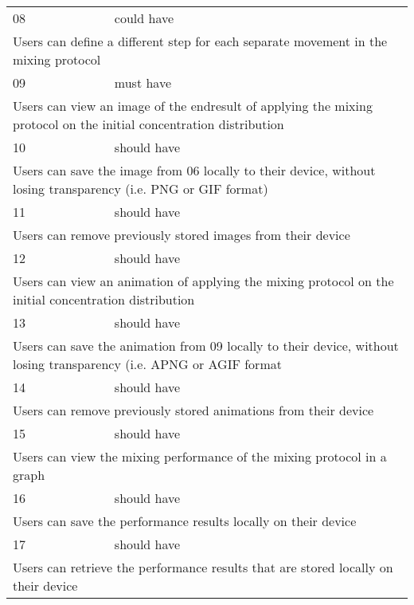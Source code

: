\begin{center}
\begin{tabular}{ p{} p{}}
08 & could have \\
\multicolumn{2}{p{\textwidth}}{Users can define a different step for each separate movement in the mixing protocol}\\
\hline

09 & must have \\
\multicolumn{2}{p{\textwidth}}{Users can view an image of the endresult of applying the mixing protocol on the initial concentration distribution} \\
\hline

10 & should have \\
\multicolumn{2}{p{\textwidth}}{Users can save the image from 06 locally to their device, without losing transparency (i.e. PNG or GIF format)} \\
\hline

11 & should have \\
\multicolumn{2}{p{\textwidth}}{Users can remove previously stored images from their device} \\
\hline

12 & should have \\
\multicolumn{2}{p{\textwidth}}{Users can view an animation of applying the mixing protocol on the initial concentration distribution} \\
\hline

13 & should have \\
\multicolumn{2}{p{\textwidth}}{Users can save the animation from 09 locally to their device, without losing transparency (i.e. APNG or AGIF format} \\
\hline

14 & should have \\
\multicolumn{2}{p{\textwidth}}{Users can remove previously stored animations from their device} \\
\hline

15 & should have \\
\multicolumn{2}{p{\textwidth}}{Users can view the mixing performance of the mixing protocol in a graph} \\
\hline

16 & should have \\
\multicolumn{2}{p{\textwidth}}{Users can save the performance results locally on their device} \\
\hline

17 & should have \\
\multicolumn{2}{p{\textwidth}}{Users can retrieve the performance results that are stored locally on their device} \\
\hline


\end{tabular}
\end{center}
